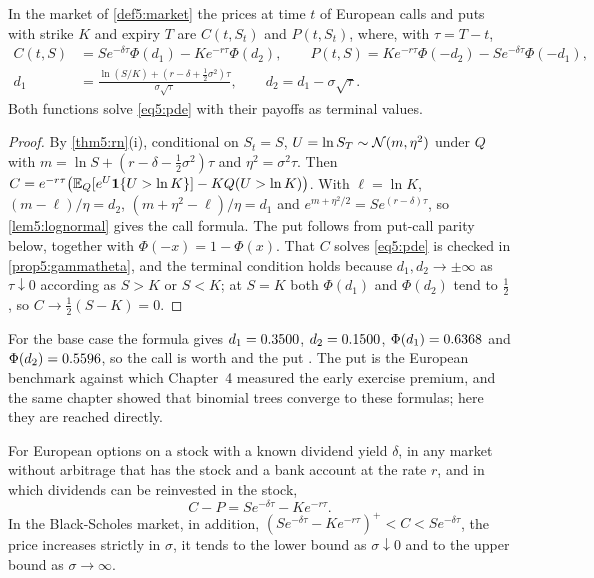 \begin{chapterrefs}
\begin{theorem}\label{thm5:bs}
In the market of \cref{def5:market} the prices at time $t$ of European calls and puts with strike $K$
and expiry $T$ are $C(t,S_t)$ and $P(t,S_t)$, where, with $\tau=T-t$,
\begin{equation}\label{eq5:bs}
\begin{aligned}
  C(t,S)&=Se^{-\delta\tau}\Phi(d_1)-Ke^{-r\tau}\Phi(d_2),\qquad
  P(t,S)=Ke^{-r\tau}\Phi(-d_2)-Se^{-\delta\tau}\Phi(-d_1),\\
  d_1&=\frac{\ln(S/K)+(r-\delta+\tfrac12\sigma^2)\tau}{\sigma\sqrt\tau},\qquad d_2=d_1-\sigma\sqrt\tau .
\end{aligned}
\end{equation}
Both functions solve \cref{eq5:pde} with their payoffs as terminal values.
\end{theorem}

\begin{proof}
By \cref{thm5:rn}(i), conditional on $S_t=S$, $U=\ln S_T\sim\mathcal{N}(m,\eta^2)$ under $Q$ with
$m=\ln S+(r-\delta-\tfrac12\sigma^2)\tau$ and $\eta^2=\sigma^2\tau$. Then
$C=e^{-r\tau}\bigl(\mathbb{E}_Q[e^U\mathbf 1\{U>\ln K\}]-KQ(U>\ln K)\bigr)$. With $\ell=\ln K$,
$(m-\ell)/\eta=d_2$, $(m+\eta^2-\ell)/\eta=d_1$ and $e^{m+\eta^2/2}=Se^{(r-\delta)\tau}$, so \cref{lem5:lognormal}
gives the call formula. The put follows from put-call parity below, together with
$\Phi(-x)=1-\Phi(x)$. That $C$ solves \cref{eq5:pde} is checked in \cref{prop5:gammatheta}, and the
terminal condition holds because $d_1,d_2\to\pm\infty$ as $\tau\downarrow0$ according as $S>K$ or $S<K$;
at $S=K$ both $\Phi(d_1)$ and $\Phi(d_2)$ tend to $\tfrac12$, so $C\to\tfrac12(S-K)=0$.
\end{proof}

For the base case the formula gives $d_1=0.3500$, $d_2=0.1500$, $\Phi(d_1)=0.6368$ and $\Phi(d_2)=0.5596$, so
the call is worth \callBase{} and the put \putBase. The put is the European benchmark against which
Chapter~4 measured the early exercise premium, and the same chapter showed that binomial
trees converge to these formulas; here they are reached directly.

\begin{proposition}\label{prop5:parity}
For European options on a stock with a known dividend yield $\delta$, in any market without arbitrage that
has the stock and a bank account at the rate $r$, and in which dividends can be reinvested in the stock,
\begin{equation}\label{eq5:parity}
  C-P=Se^{-\delta\tau}-Ke^{-r\tau}.
\end{equation}
In the Black-Scholes market, in addition, $(Se^{-\delta\tau}-Ke^{-r\tau})^+<C<Se^{-\delta\tau}$, the price increases
strictly in $\sigma$, it tends to the lower bound as $\sigma\downarrow0$ and to the upper bound as
$\sigma\to\infty$.
\end{proposition}


\end{chapterrefs}
